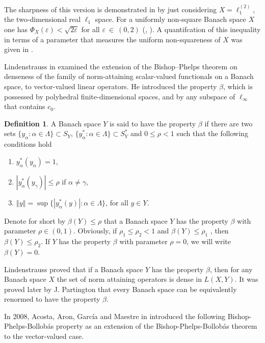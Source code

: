 \documentclass[11pt,a4paper]{amsart}
\newcommand{\eps}{\varepsilon}
\newcommand{\norm}[1]{\left\Vert#1\right\Vert}
\numberwithin{equation}{section}
\theoremstyle{plain}
\theoremstyle{definition}
\newtheorem{definition}[theorem]{Definition}
\renewcommand{\leq}{\leqslant}
\begin{document}
The sharpness of this version is demonstrated in \cite[Example~2.5]{Modul2014} by just considering $X=\ell_1^{(2)}$, the two-dimensional real $\ell_1$ space. For a uniformly non-square Banach space $X$ one has $\Phi_X(\eps)< \sqrt{2\eps}$ for all $\eps~\in~(0,2)$ (\cite[Theorem~5.9]{Modul2014}, \cite[Theorem~2.3]{Modul2016}).  A quantifcation of this inequality in terms of a parameter that measures the uniform non-squareness of $X$ was given in  \cite[Theorem 3.3]{Modul2015}.

Lindenstrauss in \cite{Lind} examined the extension of the Bishop--Phelps theorem on denseness of the family of norm-attaining scalar-valued functionals on
a Banach space, to vector-valued linear operators.
He introduced the property $\beta$, which is possessed by polyhedral finite-dimensional spaces, and by any subspace of  $\ell_\infty$ that contains $c_0$. 

\begin{definition} \label{def:beta} A Banach space $Y$ is said to have the property $\beta$ if there are two sets $\{y_\alpha: \alpha\in \Lambda\}\subset S_Y$, $\{y^*_\alpha: \alpha\in  \Lambda\}\subset S_Y^*$ and $0\leq \rho < 1$ such that the following conditions hold
\begin{enumerate}
\item $y^*_\alpha(y_\alpha) = 1$,
\item $|y^*_\alpha(y_\gamma)| \leq \rho$ if $\alpha \neq \gamma$,
\item $\norm{y} = \sup\{|y_\alpha^*(y)|: \alpha \in \Lambda\}$, for all $y\in Y$.
\end{enumerate}
\end{definition}
Denote for short by $\beta(Y)\leq\rho$ that a Banach space $Y$ has the property $\beta$ with parameter $\rho\in(0, 1)$. Obviously, if $\rho_1\leq\rho_2<1$ and $\beta(Y)\leq\rho_1$ , then $\beta(Y)\leq\rho_2$. If $Y$ has the property $\beta$ with parameter $\rho = 0$, we will write $\beta(Y)=0$.


Lindenstrauss proved that if a Banach space $Y$ has the property $\beta$, then for any Banach space $X$ the set of norm attaining operators is dense in $L(X,Y)$.  It was proved later by J. Partington \cite{Partin} that every Banach space can be equivalently renormed to have the property $\beta$.

In 2008, Acosta, Aron, Garc\'{i}a and Maestre in \cite{Acosta2008} introduced the following Bishop-Phelps-Bollob\'{a}s property as an extension of the Bishop-Phelps-Bollob\'{a}s theorem to the vector-valued case.
\end{document}
